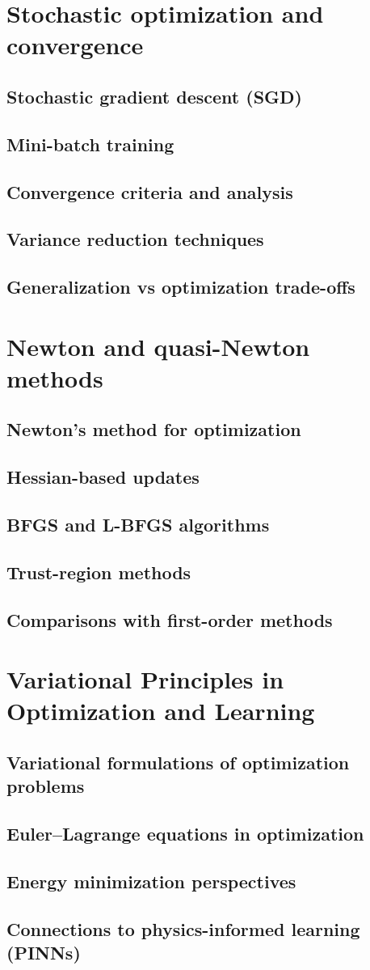 \section{Stochastic optimization and convergence}
\subsection{Stochastic gradient descent (SGD)}
\subsection{Mini-batch training}
\subsection{Convergence criteria and analysis}
\subsection{Variance reduction techniques}
\subsection{Generalization vs optimization trade-offs}

\section{Newton and quasi-Newton methods}
\subsection{Newton's method for optimization}
\subsection{Hessian-based updates}
\subsection{BFGS and L-BFGS algorithms}
\subsection{Trust-region methods}
\subsection{Comparisons with first-order methods}

\section{Variational Principles in Optimization and Learning}
\subsection{Variational formulations of optimization problems}
\subsection{Euler–Lagrange equations in optimization}
\subsection{Energy minimization perspectives}
\subsection{Connections to physics-informed learning (PINNs)}
